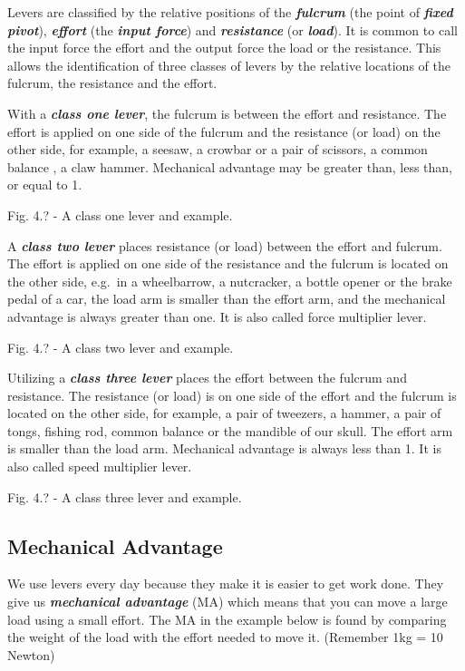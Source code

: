 \documentclass[
]{book}
\begin{document}
Levers are classified by the relative positions of the \textbf{\emph{fulcrum}} (the point of \textbf{\emph{fixed pivot}}), \textbf{\emph{effort}} (the \textbf{\emph{input force}}) and \textbf{\emph{resistance}} (or \textbf{\emph{load}}). It is common to call the input force the effort and the output force the load or the resistance. This allows the identification of three classes of levers by the relative locations of the fulcrum, the resistance and the effort.

With a \textbf{\emph{class one lever}}, the fulcrum is between the effort and resistance. The effort is applied on one side of the fulcrum and the resistance (or load) on the other side, for example, a seesaw, a crowbar or a pair of scissors, a common balance , a claw hammer. Mechanical advantage may be greater than, less than, or equal to 1.

Fig. 4.? - A class one lever and example.

A \textbf{\emph{class two lever}} places resistance (or load) between the effort and fulcrum. The effort is applied on one side of the resistance and the fulcrum is located on the other side, e.g.~in a wheelbarrow, a nutcracker, a bottle opener or the brake pedal of a car, the load arm is smaller than the effort arm, and the mechanical advantage is always greater than one. It is also called force multiplier lever.

Fig. 4.? - A class two lever and example.

Utilizing a \textbf{\emph{class three lever}} places the effort between the fulcrum and resistance. The resistance (or load) is on one side of the effort and the fulcrum is located on the other side, for example, a pair of tweezers, a hammer, a pair of tongs, fishing rod, common balance or the mandible of our skull. The effort arm is smaller than the load arm. Mechanical advantage is always less than 1. It is also called speed multiplier lever.

Fig. 4.? - A class three lever and example.

\hypertarget{mechanical-advantage}{%
\subsection{Mechanical Advantage}\label{mechanical-advantage}}

We use levers every day because they make it is easier to get work done. They give us \textbf{\emph{mechanical advantage}} (MA) which means that you can move a large load using a small effort. The MA in the example below is found by comparing the weight of the load with the effort needed to move it. (Remember 1kg = 10 Newton)
\end{document}
